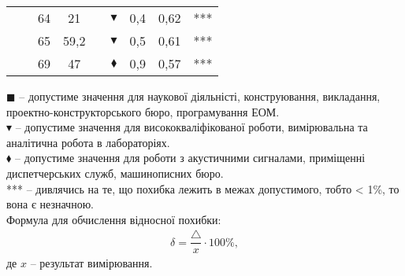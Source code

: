 \documentclass[a4paper,14pt]{extreport}
\begin{document}
\begin{landscape}
\begin{table}[h]
\begin{tabular}{|c|c|c|c|c|c|c|c|c|}
                       &                                                                               &     64      &    21        &                    &   $\blacktriangledown$      &       0,4         &             0,62 &  ***                    \\ \cline{3-4} \cline{6-9}
                       &                                                                     &     65     &      59,2      &                    &      $\blacktriangledown$     &    0,5            &             0,61 &    ***                            \\ \cline{3-4} \cline{6-9}
                       &                                                                       &     69     &      47      &                    &    $\blacklozenge$   &       0,9         &             0,57 &  ***      \\ \hline
\end{tabular}
\end{table}
\par
$\blacksquare$  -- допустиме значення для наукової діяльністі, конструювання, викладання, проектно-конструкторського бюро, програмування ЕОМ.\\

$\blacktriangledown$ -- допустиме значення для висококваліфікованої роботи, вимірювальна та аналітична робота в лабораторіях.\\

$\blacklozenge$ -- допустиме значення для роботи з акустичними сигналами, приміщенні диспетчерських служб, машинописних бюро. \\

*** -- дивлячись на те, що похибка лежить в межах допустимого, тобто < 1\%, то вона є незначною.\\

Формула для обчислення відносної похибки:
\begin{align}
  \delta = \dfrac{\triangle}{x}\cdot 100\%,
\end{align}
де $x$ -- результат вимірювання.

\end{landscape}
\end{document}
